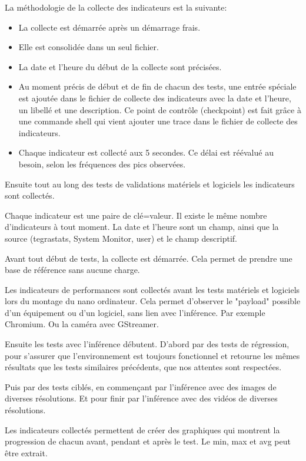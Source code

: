\par La méthodologie de la collecte des indicateurs est la suivante: 
\begin{itemize}
    \item La collecte est démarrée après un démarrage frais.
    \item Elle est consolidée dans un seul fichier.
    \item La date et l'heure du début de la collecte sont précisées.
    \item Au moment précis de début et de fin de chacun des tests, une entrée spéciale est ajoutée dans le fichier de collecte des indicateurs avec la date et l'heure, un libellé et une description. Ce point de contrôle (checkpoint) est fait grâce à une commande shell qui vient ajouter une trace dans le fichier de collecte des indicateurs.
    \item Chaque indicateur est collecté aux 5 secondes. Ce délai est réévalué au besoin, selon les fréquences des pics observées. 
\end{itemize}
\par Ensuite tout au long des tests de validations matériels et logiciels les indicateurs sont collectés. 
\par Chaque indicateur est une paire de clé=valeur. Il existe le même nombre d'indicateurs à tout moment. La date et l'heure sont un champ, ainsi que la source (tegrastats, System Monitor, user) et le champ descriptif. 
\par Avant tout début de tests, la collecte est démarrée. Cela permet de prendre une base de référence sans aucune charge.
\par Les indicateurs de performances sont collectés avant les tests matériels et logiciels lors du montage du nano ordinateur. Cela permet d'observer le "payload" possible d'un équipement ou d'un logiciel, sans lien avec l'inférence. Par exemple Chromium. Ou la caméra avec GStreamer. 
\par Ensuite les tests avec l'inférence débutent. D'abord par des tests de régression, pour s'assurer que l'environnement est toujours fonctionnel et retourne les mêmes résultats que les tests similaires précédents, que nos attentes sont respectées. 
\par Puis par des tests ciblés, en commençant par l'inférence avec des images de diverses résolutions. Et pour finir par l'inférence avec des vidéos de diverses résolutions. 
\par Les indicateurs collectés permettent de créer des graphiques qui montrent la progression de chacun avant, pendant et après le test.  Le min, max et avg peut être extrait.
